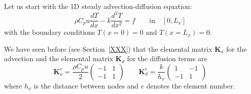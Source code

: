 
Let us start with the 1D steady advection-diffusion equation:
\begin{equation}
\rho C_p u \frac{dT}{dx} - k \frac{d^2T}{dx^2} = f \qquad \text{in} \quad [0,L_x]
\label{eq:fdm1Dad}
\end{equation}
with the boundary conditions $T(x=0)=0$ and $T(x=L_x)=0$.

We have seen before (see Section~\ref{XXX}) 
that the elemental matrix ${\bm K}_a$ for the advection and 
the elemental matrix  ${\bm K}_d$ for the diffusion terms are
\[
{\bm K}_a^e = \frac{\rho C_p u}{2} 
\left(
\begin{array}{cc}
-1 & 1 \\
-1 & 1 
\end{array}
\right)
\qquad
{\bm K}_d^e=\frac{k}{h_x}
\left(
\begin{array}{cc}
1 & -1 \\ 
-1 & 1
\end{array}
\right)
\]
where $h_x$ is the distance between nodes and $e$ denotes the element number. 

